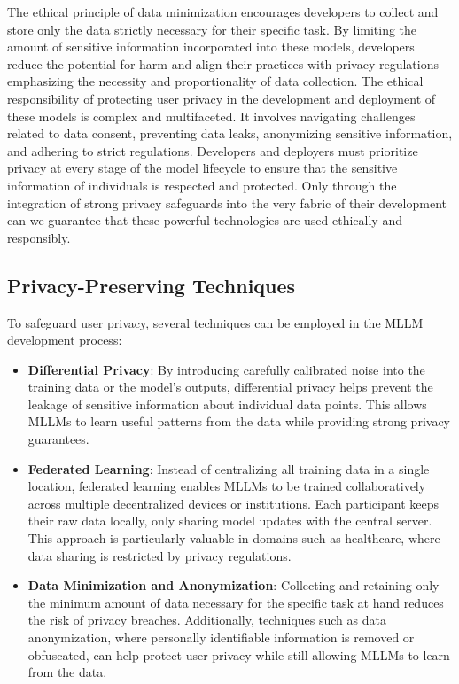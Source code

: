 The ethical principle of data minimization encourages developers to collect and store only the data strictly necessary for their specific task. By limiting the amount of sensitive information incorporated into these models, developers reduce the potential for harm and align their practices with privacy regulations emphasizing the necessity and proportionality of data collection. The ethical responsibility of protecting user privacy in the development and deployment of these models is complex and multifaceted. It involves navigating challenges related to data consent, preventing data leaks, anonymizing sensitive information, and adhering to strict regulations. Developers and deployers must prioritize privacy at every stage of the model lifecycle to ensure that the sensitive information of individuals is respected and protected. Only through the integration of strong privacy safeguards into the very fabric of their development can we guarantee that these powerful technologies are used ethically and responsibly\cite{sanderson2023ai,phattanaviroj2024data, kibriya2024privacy }.

\subsection{Privacy-Preserving Techniques}

To safeguard user privacy, several techniques can be employed in the MLLM development process:

\begin{itemize}
    \item \textbf{Differential Privacy}: By introducing carefully calibrated noise into the training data or the model's outputs, differential privacy helps prevent the leakage of sensitive information about individual data points. This allows MLLMs to learn useful patterns from the data while providing strong privacy guarantees\cite{singh2024whispered,charles2024fine}.
    
    \item \textbf{Federated Learning}: Instead of centralizing all training data in a single location, federated learning enables MLLMs to be trained collaboratively across multiple decentralized devices or institutions. Each participant keeps their raw data locally, only sharing model updates with the central server. This approach is particularly valuable in domains such as healthcare, where data sharing is restricted by privacy regulations\cite{kuang2024federatedscope}.
    
    \item \textbf{Data Minimization and Anonymization}: Collecting and retaining only the minimum amount of data necessary for the specific task at hand reduces the risk of privacy breaches. Additionally, techniques such as data anonymization, where personally identifiable information is removed or obfuscated, can help protect user privacy while still allowing MLLMs to learn from the data\cite{wiest2024anonymizing, li2024llm}.
\end{itemize}


